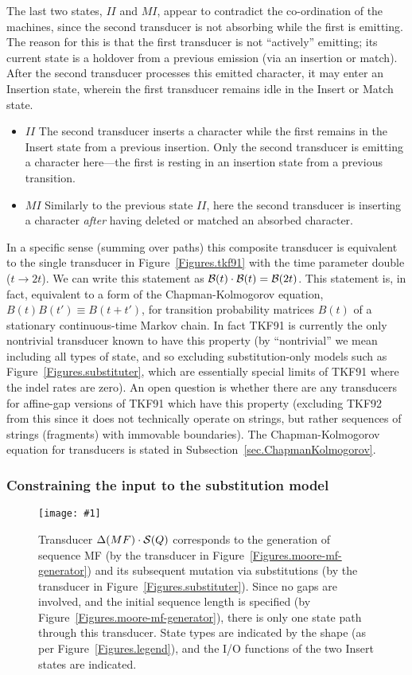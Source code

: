 \documentclass{article}
\newcommand{\secref}[1]{Subsection~\ref{sec.#1}}
\newcommand{\figref}[1]{Figure~\ref{Figures.#1}}
\newcommand{\figlabel}[1]{\label{Figures.#1}}
\newcommand{\easyfig}[4]{
\begin{figure}
\texttt{[image: \#1]}
\caption{ \figlabel{#3} #4}
\end{figure}}
\newcommand{\pdffig}[2]{\easyfig{#1-fig.pdf}{}{#1}{#2}}
\newcommand\substitute{{\cal S}}
\newcommand\tkf{{\cal B}}
\newcommand\generate{\Delta}
\begin{document}
The last two states, $II$ and $MI$, appear to contradict the co-ordination of the machines, 
since the second transducer is not absorbing while the first is emitting. 
The reason for this is that the first transducer is not ``actively'' emitting; 
its current state is a holdover from a previous emission (via an insertion or match). 
After the second transducer processes this emitted character, it may enter an Insertion 
state, wherein the first transducer remains idle in the Insert or Match state. 
\begin{itemize}
\item $II$ The second transducer inserts a character while the first remains in the Insert state from a previous insertion.  Only the second transducer is emitting a character here---the first is resting in an insertion state from a previous transition.  
\item $MI$ Similarly to the previous state $II$, here the second transducer is inserting a character {\em after} having deleted or matched an absorbed character.
\end{itemize}



In a specific sense (summing over paths)
this composite transducer is equivalent to the single transducer in \figref{tkf91}
with the time parameter double ($t \to 2t$).
We can write this statement as $\tkf(t) \cdot \tkf(t) = \tkf(2t)$.
This statement is, in fact, equivalent to a form of the Chapman-Kolmogorov equation,
$B(t)B(t') \equiv B(t+t')$,
for transition probability matrices $B(t)$ of a stationary continuous-time Markov chain.
In fact TKF91 is currently the only nontrivial transducer known to have this property
(by ``nontrivial'' we mean including all types of state, and so excluding substitution-only models such as \figref{substituter},
which are essentially special limits of TKF91 where the indel rates are zero).
An open question is whether there are any transducers for affine-gap versions of TKF91 which
have this property
(excluding TKF92 from this since it does not technically operate on strings, but rather
sequences of strings (fragments) with immovable boundaries).  
The Chapman-Kolmogorov equation for transducers
is stated in \secref{ChapmanKolmogorov}.

\subsubsection{Constraining the input to the substitution model}
\pdffig{mf-substituter}{Transducer $\generate(MF) \cdot \substitute(Q)$
corresponds to the generation of sequence MF (by the transducer in \figref{moore-mf-generator})
and its subsequent mutation via substitutions (by the transducer in \figref{substituter}).
Since no gaps are involved, and the initial sequence length is specified (by \figref{moore-mf-generator}),
there is only one state path through this transducer.
State types are indicated by the shape (as per \figref{legend}), and the I/O functions of the two Insert states are indicated.  }
\end{document}
